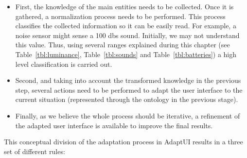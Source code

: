 \begin{itemize}
 \item First, the knowledge of the main entities needs to be collected. Once it
 is gathered, a normalization process needs to be performed. This process classifies
 the collected information so it can be easily read. For example, a noise sensor
 might sense a 100 \acp{db} sound. Initially, we may not understand this value. Thus,
 using several ranges explained during this chapter (see Table~\ref{tbl:luminance},
 Table~\ref{tbl:sounds} and Table~\ref{tbl:batteries}) a high level classification
 is carried out.
 
 \item Second, and taking into account the transformed knowledge in the previous
 step, several actions need to be performed to adapt the user interface to the
 current situation (represented through the ontology in the previous stage).
 
 \item Finally, as we believe the whole process should be iterative, a refinement
 of the adapted user interface is available to improve the final results.
\end{itemize}

This conceptual division of the adaptation process in AdaptUI results in a three
set of different rules:

